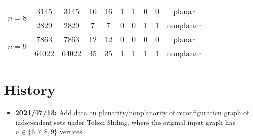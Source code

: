 \documentclass[a4paper]{article}
\theoremstyle{definition}
\theoremstyle{remark}
\numberwithin{equation}{section}
\begin{document}
\begin{table}[!ht]
\begin{tabular}{|c|c|c|c|c|c|c|c|c|c|}
		\multirow{2}{*}{$n = 8$} & \href{ISReconf/TokenSliding/G.planar_conn.8.planarTS.txt}{3145}         & \href{ISReconf/TokenSliding/TSG.planar_conn.8.planar.txt}{3145}                   & \href{ISReconf/TokenSliding/G.trees.8.planarTS.txt}{16}    & \href{ISReconf/TokenSliding/TSG.planar_conn.8.planar.txt}{16}                & \href{ISReconf/TokenSliding/G.path.8.planarTS.txt}{1}     & \href{ISReconf/TokenSliding/TSG.path.8.planar.txt}{1}                 & 0     & 0                  & planar                                       \\ \cline{2-10} 
		& \href{ISReconf/TokenSliding/G.planar_conn.8.nonplanarTS.txt}{2829}         & \href{ISReconf/TokenSliding/TSG.planar_conn.8.kuratowski.txt}{2829}                   & \href{ISReconf/TokenSliding/G.trees.8.nonplanarTS.txt}{7}     & \href{ISReconf/TokenSliding/TSG.trees.8.kuratowski.txt}{7}                 & 0     & 0                 & \href{ISReconf/TokenSliding/G.cycle.8.nonplanarTS.txt}{1}     & \href{ISReconf/TokenSliding/TSG.cycle.8.kuratowski.txt}{1}                  & nonplanar                                    \\ \hline
		\multirow{2}{*}{$n = 9$} & \href{ISReconf/TokenSliding/G.planar_conn.9.planarTS.txt}{7863}         & \href{ISReconf/TokenSliding/TSG.planar_conn.9.planar.txt}{7863}                   & \href{ISReconf/TokenSliding/G.trees.9.planarTS.txt}{12}      & \href{ISReconf/TokenSliding/TSG.trees.9.planar.txt}{12}                  & 0     & 0                 & 0     & 0                  & planar                                       \\ \cline{2-10} 
		& \href{ISReconf/TokenSliding/G.planar_conn.9.nonplanarTS.txt}{64022}        & \href{ISReconf/TokenSliding/TSG.planar_conn.9.kuratowski.txt}{64022}                  & \href{ISReconf/TokenSliding/G.trees.9.nonplanarTS.txt}{35}      & \href{ISReconf/TokenSliding/TSG.trees.9.kuratowski.txt}{35}                  & \href{ISReconf/TokenSliding/G.path.9.nonplanarTS.txt}{1}     & \href{ISReconf/TokenSliding/TSG.path.9.kuratowski.txt}{1}                 & \href{ISReconf/TokenSliding/G.cycle.9.nonplanarTS.txt}{1}     & \href{ISReconf/TokenSliding/TSG.cycle.9.kuratowski.txt}{1}                  & nonplanar                                    \\ \hline
	\end{tabular}
\end{table}

\section*{History}

\begin{itemize}
	\item \textbf{2021/07/13:} Add data on planarity/nonplanarity of reconfiguration graph of independent sets under Token Sliding, where the original input graph has $n \in \{6, 7, 8, 9\}$ vertices.
\end{itemize}

%


\end{document}
